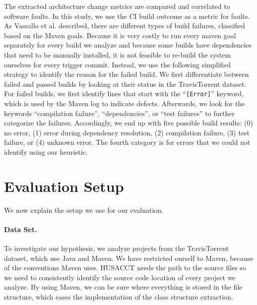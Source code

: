 \documentclass[sigplan, anonymous, review]{acmart}
\begin{document}
The extracted architecture change metrics are compared and correlated to software faults. In this study, we use the CI build outcome as a metric for faults. 
As Vassallo et al. \cite{CIFailTypes} described, there are different types of build failures, classified based on the Maven goals. 
Because it is very costly to run every maven goal separately for every build we analyze and because some builds have dependencies that need to be manually installed, it is not feasible to re-build the system ourselves for every trigger commit.
Instead, we use the following simplified strategy to identify the reason for the failed build.
We first differentiate between failed and passed builds by looking at their status in the TravisTorrent dataset. For failed builds, we first identify lines that start with the ``\texttt{[Error]}'' keyword, which is used by the Maven log to indicate defects. Afterwards, we look for the keywords ``compilation failure'', ``dependencies'', or ``test failures'' to further categorize the failures. Accordingly, we end up with five possible build results: (0) no error, (1) error during dependency resolution, (2) compilation failure, (3) test failure, or (4) unknown error. The fourth category is for errors that we could not identify using our heuristic.

\section{Evaluation Setup}



We now explain the setup we use for our evaluation.

\paragraph{Data Set.}
To investigate our hypothesis, we analyze projects from the TravisTorrent dataset, which use Java and Maven. 
We have restricted ourself to Maven, because of the conventions Maven uses. HUSACCT needs the path to the source files so we need to consistently identify the source code location of every project we analyze. By using Maven, we can be sure where everything is stored in the file structure, which eases the implementation of the class structure extraction.
\end{document}
